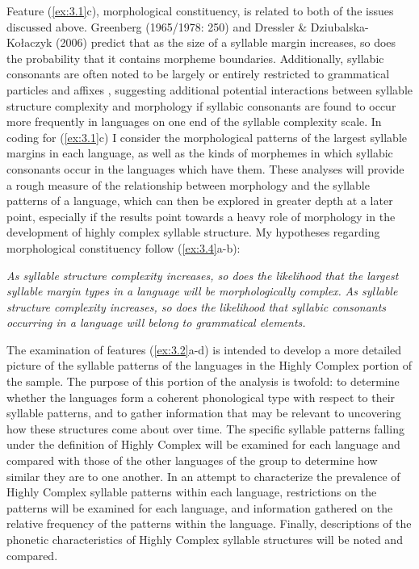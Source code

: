   Feature (\ref{ex:3.1}c), morphological constituency, is related to both of the issues discussed above. Greenberg (1965/1978: 250) and Dressler \& Dziubalska-Kołaczyk (2006) predict that as the size of a syllable margin increases, so does the probability that it contains morpheme boundaries. Additionally, syllabic consonants are often noted to be largely or entirely restricted to grammatical particles and affixes \citep[159]{Bell1978a}, suggesting additional potential interactions between syllable structure complexity and morphology if syllabic consonants are found to occur more frequently in languages on one end of the syllable complexity scale. In coding for (\ref{ex:3.1}c) I consider the morphological patterns of the largest syllable margins in each language, as well as the kinds of morphemes in which syllabic consonants occur in the languages which have them. These analyses will provide a rough measure of the relationship between morphology and the syllable patterns of a language, which can then be explored in greater depth at a later point, especially if the results point towards a heavy role of morphology in the development of highly complex syllable structure. My hypotheses regarding morphological constituency follow (\ref{ex:3.4}a-b):

\ea\label{ex:3.4}
\ea  \textit{As syllable structure complexity increases, so does the likelihood that the largest syllable margin types in a language will be morphologically complex.} 
\ex  \textit{As syllable structure complexity increases, so does the likelihood that syllabic consonants occurring in a language will belong to grammatical elements.}
\z
\z

  The examination of features (\ref{ex:3.2}a-d) is intended to develop a more detailed picture of the syllable patterns of the languages in the Highly Complex portion of the sample. The purpose of this portion of the analysis is twofold: to determine whether the languages form a coherent phonological type with respect to their syllable patterns, and to gather information that may be relevant to uncovering how these structures come about over time. The specific syllable patterns falling under the definition of Highly Complex will be examined for each language and compared with those of the other languages of the group to determine how similar they are to one another. In an attempt to characterize the prevalence of Highly Complex syllable patterns within each language, restrictions on the patterns will be examined for each language, and information gathered on the relative frequency of the patterns within the language. Finally, descriptions of the phonetic characteristics of Highly Complex syllable structures will be noted and compared.


